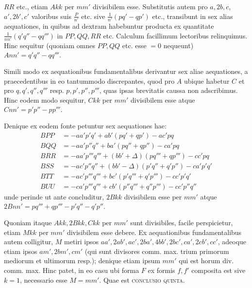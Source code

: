 $RR$ etc., etiam $Akk$ per $mm'$ divisibilem esse. Substitutis autem pro $a,2b,c$, $a',2b',c'$ valoribus suis $\frac{P}{n'}$ etc. sive $\frac{1}{n'}(pq'-qp')$ etc., transibunt in sex alias aequationes, in quibus ad dextram habebuntur producta ex quantitate $\frac{1}{nn'}(q'q''-qq''')$ in $PP,QQ,RR$ etc. Calculum facillimum lectoribus relinquimus. Hinc sequitur (quoniam omnes $PP,QQ$ etc. esse $=0$ nequeunt) $Ann'=q'q''-qq'''$.

Simili modo ex aequationibus fundamentalibus derivantur sex aliae aequationes, a praecedentibus in eo tantummodo discrepantes, quod pro $A$ ubique habetur $C$ et pro $q,q',q'',q'''$ resp. $p,p',p'',p'''$, quas ipsas brevitatis caussa non adscribimus. Hinc eodem modo sequitur, $Ckk$ per $mm'$ divisibilem esse atque $Cnn'=p'p''-pp'''$.

Denique ex eodem fonte petuntur sex aequationes hae:
\[
\begin{aligned}
BPP&=-aa'p'q'+ab'(pq'+qp')-ac'pq\\
BQQ&=-aa'p''q''+ba'(pq''+qp'')-ca'pq\\
BRR&=-aa'p'''q'''+(bb'+\Delta)(pq'''+qp''')-cc'pq\\
BSS&=-ac'p''q''+(bb'-\Delta)(p'q''+q'p'')-ca'p'q'\\
BTT&=-ac'p'''q'''+bc'(p'q'''+q'p''')-cc'p'q'\\
BUU&=-ca'p'''q'''+cb'(p''q'''+q''p''')-cc'p''q''
\end{aligned}
\]
unde perinde ut ante concluditur, $2Bkk$ divisibilem esse per $mm'$ atque $2Bnn'=pq'''+qp'''-p'q''-q'p''$.

Quoniam itaque $Akk,2Bkk,Ckk$ per $mm'$ sunt divisibiles, facile perspicietur, etiam $Mkk$ per $mm'$ divisibilem esse debere. Ex aequationibus fundamentalibus autem colligitur, $M$ metiri ipsos $aa',\allowbreak 2ab',\allowbreak ac',\allowbreak 2ba',\allowbreak 4bb',\allowbreak 2bc',\allowbreak ca',\allowbreak 2cb',\allowbreak cc'$, adeoque etiam ipsos $am',2bm',cm'$ (qui sunt divisores comm. max. trium primorum mediorum et ultimorum resp.); denique etiam ipsum $mm'$ qui est horum div. comm. max. Hinc patet, in eo casu ubi forma $F$ ex formis $f,f'$ composita est sive $k=1$, necessario esse $M=mm'$. Quae est \textsc{conclusio quinta}.


